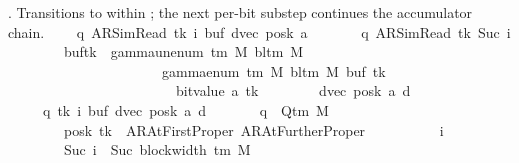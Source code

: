 \begin{isabellebody}
{       .  Transitions to 
       within ; the next per-bit
       substep continues the accumulator chain.%
}\isanewline
\ \ \ \ {\isacharbraceleft}{\kern0pt}{\isacharparenleft}{\kern0pt}{\isacharparenleft}{\kern0pt}q{\isacharcomma}{\kern0pt}\ AR{\isacharunderscore}{\kern0pt}SimRead{\isacharcomma}{\kern0pt}\ tk{\isacharcomma}{\kern0pt}\ i{\isacharcomma}{\kern0pt}\ buf{\isacharcomma}{\kern0pt}\ dvec{\isacharcomma}{\kern0pt}\ posk{\isacharparenright}{\kern0pt}{\isacharcomma}{\kern0pt}\ a{\isacharcomma}{\kern0pt}\isanewline
\ \ \ \ \ \ \ {\isacharparenleft}{\kern0pt}q{\isacharcomma}{\kern0pt}\ AR{\isacharunderscore}{\kern0pt}SimRead{\isacharcomma}{\kern0pt}\ tk{\isacharcomma}{\kern0pt}\ Suc\ i{\isacharcomma}{\kern0pt}\isanewline
\ \ \ \ \ \ \ \ buf{\isacharparenleft}{\kern0pt}tk\ {\isacharcolon}{\kern0pt}{\isacharequal}{\kern0pt}\ gamma{\isacharunderscore}{\kern0pt}unenum\ {\isacharparenleft}{\kern0pt}{\isasymGamma}{\isacharunderscore}{\kern0pt}tm\ M{\isacharparenright}{\kern0pt}\ {\isacharparenleft}{\kern0pt}bl{\isacharunderscore}{\kern0pt}tm\ M{\isacharparenright}{\kern0pt}\isanewline
\ \ \ \ \ \ \ \ \ \ \ \ \ \ \ \ \ \ \ \ {\isacharparenleft}{\kern0pt}{}\ {\isacharasterisk}{\kern0pt}\ gamma{\isacharunderscore}{\kern0pt}enum\ {\isacharparenleft}{\kern0pt}{\isasymGamma}{\isacharunderscore}{\kern0pt}tm\ M{\isacharparenright}{\kern0pt}\ {\isacharparenleft}{\kern0pt}bl{\isacharunderscore}{\kern0pt}tm\ M{\isacharparenright}{\kern0pt}\ {\isacharparenleft}{\kern0pt}buf\ tk{\isacharparenright}{\kern0pt}\isanewline
\ \ \ \ \ \ \ \ \ \ \ \ \ \ \ \ \ \ \ \ \ \ \ {\isacharplus}{\kern0pt}\ bit{\isacharunderscore}{\kern0pt}value\ {\isacharparenleft}{\kern0pt}a\ tk{\isacharparenright}{\kern0pt}{\isacharparenright}{\kern0pt}{\isacharparenright}{\kern0pt}{\isacharcomma}{\kern0pt}\isanewline
\ \ \ \ \ \ \ \ dvec{\isacharcomma}{\kern0pt}\ posk{\isacharparenright}{\kern0pt}{\isacharcomma}{\kern0pt}\ a{\isacharcomma}{\kern0pt}\ d{\isacharparenright}{\kern0pt}\ {\isacharbar}{\kern0pt}\isanewline
\ \ \ \ \ q\ tk\ i\ buf\ dvec\ posk\ a\ d{\isachardot}{\kern0pt}\isanewline
\ \ \ \ \ \ \ q\ {\isasymin}\ Q{\isacharunderscore}{\kern0pt}tm\ M\isanewline
\ \ \ \ \ \ \ {\isasymand}\ posk\ tk\ {\isasymin}\ {\isacharbraceleft}{\kern0pt}AR{\isacharunderscore}{\kern0pt}AtFirstProper{\isacharcomma}{\kern0pt}\ AR{\isacharunderscore}{\kern0pt}AtFurtherProper{\isacharbraceright}{\kern0pt}\isanewline
\ \ \ \ \ \ \ {\isasymand}\ {}\ {\isasymle}\ i\isanewline
\ \ \ \ \ \ \ {\isasymand}\ Suc\ i\ {\isasymle}\ Suc\ {\isacharparenleft}{\kern0pt}block{\isacharunderscore}{\kern0pt}width\ {\isacharparenleft}{\kern0pt}{\isasymGamma}{\isacharunderscore}{\kern0pt}tm\ M{\isacharparenright}{\kern0pt}{\isacharparenright}{\kern0pt}\isanewline

\end{isabellebody}

